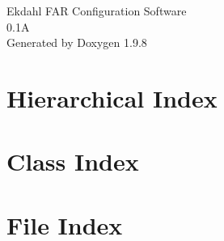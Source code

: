 \documentclass[twoside]{book}
\newcommand{\+}{\discretionary{\mbox{\scriptsize$\hookleftarrow$}}{}{}}
\newcommand{\clearemptydoublepage}{%
    \newpage{\pagestyle{empty}\cleardoublepage}%
  }
\begin{document}
  \raggedbottom
    \hypersetup{pageanchor=false,
                bookmarksnumbered=true,
                pdfencoding=unicode
               }
  \begin{titlepage}
  \vspace*{7cm}
  \begin{center}%
  {\Large Ekdahl FAR Configuration Software}\\
  [1ex]\large 0.\+1A \\
  \vspace*{1cm}
  {\large Generated by Doxygen 1.9.8}\\
  \end{center}
  \end{titlepage}
  \clearemptydoublepage
  \tableofcontents
  \clearemptydoublepage
  \hypersetup{pageanchor=true}

\chapter{Hierarchical Index}

\chapter{Class Index}

\chapter{File Index}

\end{document}
